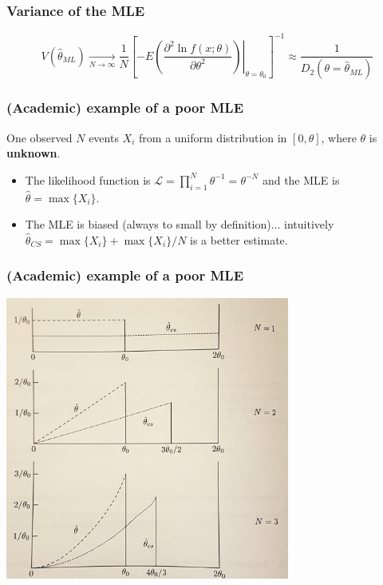 \documentclass[9pt]{beamer}
\begin{document}
\begin{frame}
 \frametitle{Variance of the MLE}
 
 $$V(\hat{\theta}_{ML}) \xrightarrow[N\to\infty]{} \frac{1}{N} \left[ \left.-E\left(\frac{\partial^2\ln f(x;\theta)}{\partial \theta^2}\right)\right|_{\theta=\theta_0} \right]^{-1} \approx \frac{1}{D_2(\theta=\hat{\theta}_{ML})}$$
 
\end{frame}

\begin{frame}
 \frametitle{(Academic) example of a poor MLE}
 
 One observed $N$ events $X_i$ from a uniform distribution in $[0,\theta]$, where $\theta$ is \textbf{unknown}. 
 
 \begin{itemize}
  \item The likelihood function is $\mathcal{L} = \prod_{i=1}^N \theta^{-1} = \theta^{-N}$ and the MLE is $\hat{\theta} = \max\{X_i\}$.
  \item The MLE is biased (always to small by definition)... intuitively $\hat{\theta}_{CS} = \max\{X_i\} + \max\{X_i\}/N$ is a better estimate.
 \end{itemize}
\end{frame}

\begin{frame}
 \frametitle{(Academic) example of a poor MLE}
 
 \begin{center}
  \includegraphics[width=0.7\textwidth]{academic_MLE.jpg}
 \end{center}

\end{frame}
\end{document}
